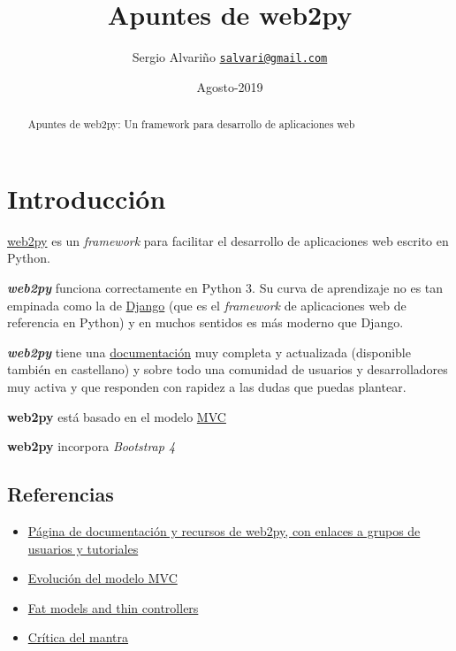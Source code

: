 \documentclass[
  12pt,
  spanish,
]{article}
\title{Apuntes de web2py}
\author{Sergio Alvariño
\href{mailto:salvari@gmail.com}{\nolinkurl{salvari@gmail.com}}}
\date{Agosto-2019}
\providecommand{\tightlist}{%
  \setlength{\itemsep}{0pt}\setlength{\parskip}{0pt}}
\begin{document}
\maketitle
\begin{abstract}
Apuntes de web2py: Un framework para desarrollo de aplicaciones web
\end{abstract}

{
\hypersetup{linkcolor=}
\setcounter{tocdepth}{3}
\tableofcontents
}
\hypertarget{introducciuxf3n}{%
\section{Introducción}\label{introducciuxf3n}}

\href{http://www.web2py.com/}{web2py} es un \emph{framework} para
facilitar el desarrollo de aplicaciones web escrito en Python.

\textbf{\emph{web2py}} funciona correctamente en Python 3. Su curva de
aprendizaje no es tan empinada como la de
\href{https://www.djangoproject.com/}{Django} (que es el
\emph{framework} de aplicaciones web de referencia en Python) y en
muchos sentidos es más moderno que Django.

\textbf{\emph{web2py}} tiene una
\href{http://www.web2py.com/init/default/documentation}{documentación}
muy completa y actualizada (disponible también en castellano) y sobre
todo una comunidad de usuarios y desarrolladores muy activa y que
responden con rapidez a las dudas que puedas plantear.

\textbf{web2py} está basado en el modelo
\href{https://es.wikipedia.org/wiki/Modelo\%E2\%80\%93vista\%E2\%80\%93controlador}{MVC}

\textbf{web2py} incorpora \emph{Bootstrap 4}

\hypertarget{referencias}{%
\subsection{Referencias}\label{referencias}}

\begin{itemize}
\tightlist
\item
  \href{http://www.web2py.com/init/default/documentation}{Página de
  documentación y recursos de web2py, con enlaces a grupos de usuarios y
  tutoriales}
\item
  \href{https://martinfowler.com/eaaDev/uiArchs.html}{Evolución del
  modelo MVC}
\item
  \href{https://nomadphp.com/blog/60/working-with-the-thin-controller-and-fat-model-concept-in-laravel}{Fat
  models and thin controllers}
\item
  \href{https://nomadphp.com/blog/60/working-with-the-thin-controller-and-fat-model-concept-in-laravel}{Crítica
  del mantra}
\end{itemize}
\end{document}
